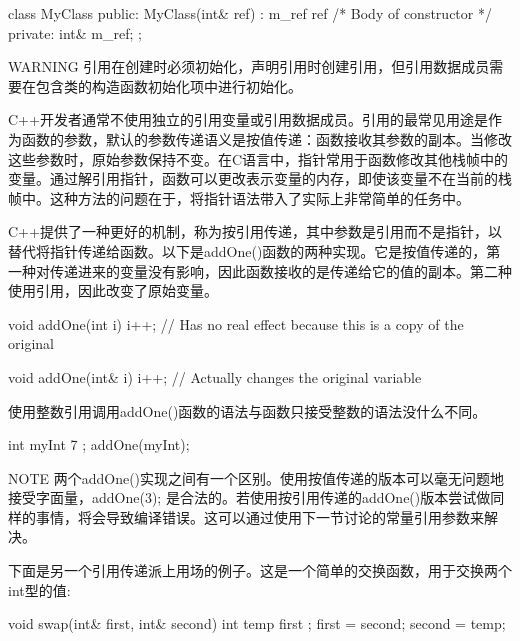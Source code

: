 \begin{cpp}
class MyClass
{
    public:
        MyClass(int& ref) : m_ref { ref } { /* Body of constructor */ }
    private:
        int& m_ref;
};
\end{cpp}

\begin{myWarning}{WARNING}
引用在创建时必须初始化，声明引用时创建引用，但引用数据成员需要在包含类的构造函数初始化项中进行初始化。
\end{myWarning}


C++开发者通常不使用独立的引用变量或引用数据成员。引用的最常见用途是作为函数的参数，默认的参数传递语义是按值传递：函数接收其参数的副本。当修改这些参数时，原始参数保持不变。在C语言中，指针常用于函数修改其他栈帧中的变量。通过解引用指针，函数可以更改表示变量的内存，即使该变量不在当前的栈帧中。这种方法的问题在于，将指针语法带入了实际上非常简单的任务中。

C++提供了一种更好的机制，称为按引用传递，其中参数是引用而不是指针，以替代将指针传递给函数。以下是addOne()函数的两种实现。它是按值传递的，第一种对传递进来的变量没有影响，因此函数接收的是传递给它的值的副本。第二种使用引用，因此改变了原始变量。

\begin{cpp}
void addOne(int i)
{
    i++; // Has no real effect because this is a copy of the original
}

void addOne(int& i)
{
    i++; // Actually changes the original variable
}
\end{cpp}

使用整数引用调用addOne()函数的语法与函数只接受整数的语法没什么不同。

\begin{cpp}
int myInt { 7 };
addOne(myInt);
\end{cpp}

\begin{myNotic}{NOTE}
两个addOne()实现之间有一个区别。使用按值传递的版本可以毫无问题地接受字面量，addOne(3); 是合法的。若使用按引用传递的addOne()版本尝试做同样的事情，将会导致编译错误。这可以通过使用下一节讨论的常量引用参数来解决。
\end{myNotic}

下面是另一个引用传递派上用场的例子。这是一个简单的交换函数，用于交换两个int型的值:

\begin{cpp}
void swap(int& first, int& second)
{
    int temp { first };
    first = second;
    second = temp;
}
\end{cpp}

